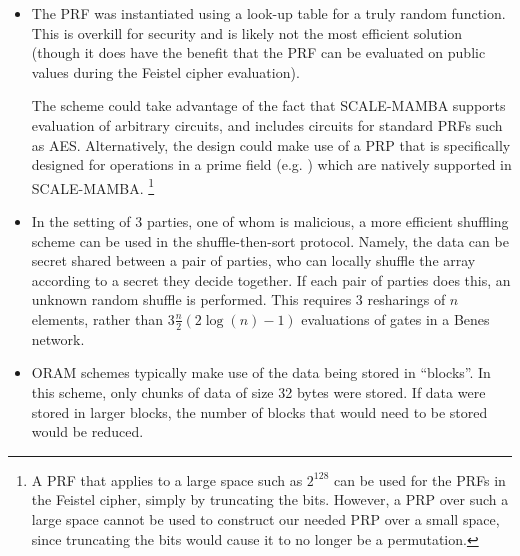 \begin{itemize}

\item
The PRF was instantiated using a look-up table for a truly random function.
This is overkill for security and is likely not the most efficient solution
(though it does have the benefit that the PRF can be evaluated on 
public values during the Feistel cipher evaluation).

The scheme could take advantage of the fact that SCALE-MAMBA supports
evaluation of arbitrary circuits, and includes circuits for 
standard PRFs such as AES. 
Alternatively, the design could make use of a PRP that is specifically
designed for operations in a prime field (e.g. \cite{albrecht2016mimc})
which are natively supported in SCALE-MAMBA.
\footnote{
A PRF that applies to a large space such as $2^{128}$
can be used for the PRFs in the Feistel cipher, simply by truncating the bits.
However, a PRP over such a large space cannot be used to 
construct our needed PRP over a small space, since
truncating the bits would cause it to no longer be a permutation.}

\item
In the setting of 3 parties, one of whom is malicious,
a more efficient shuffling scheme can be used in the shuffle-then-sort protocol.
Namely, the data can be secret shared between a pair of parties,
who can locally shuffle the array according to a secret they decide together.
If each pair of parties does this, an unknown random shuffle is performed.
This requires 3 resharings of $n$ elements, rather than 3$\frac{n}{2} (2\log(n) - 1)$ evaluations of gates in a Benes network.

\item
ORAM schemes typically make use of the data being stored in ``blocks''.
In this scheme, only chunks of data of size 32 bytes were stored.
If data were stored in larger blocks, the number of blocks
that would need to be stored would be reduced.


\end{itemize}



